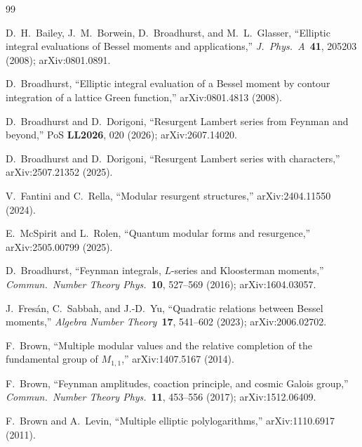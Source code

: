 \documentclass[aps,pra,twocolumn,superscriptaddress,longbibliography]{revtex4-2}
\begin{document}
\begin{thebibliography}{99}

D.~H.~Bailey, J.~M.~Borwein, D.~Broadhurst, and M.~L.~Glasser, ``Elliptic
integral evaluations of Bessel moments and applications,''
\textit{J.\ Phys.\ A}\ \textbf{41}, 205203 (2008); arXiv:0801.0891.

D.~Broadhurst, ``Elliptic integral evaluation of a Bessel moment by contour
integration of a lattice Green function,'' arXiv:0801.4813 (2008).

D.~Broadhurst and D.~Dorigoni, ``Resurgent Lambert series from Feynman and
beyond,'' PoS \textbf{LL2026}, 020 (2026); arXiv:2607.14020.

D.~Broadhurst and D.~Dorigoni, ``Resurgent Lambert series with characters,''
arXiv:2507.21352 (2025).

V.~Fantini and C.~Rella, ``Modular resurgent structures,'' arXiv:2404.11550
(2024).

E.~McSpirit and L.~Rolen, ``Quantum modular forms and resurgence,''
arXiv:2505.00799 (2025).

D.~Broadhurst, ``Feynman integrals, $L$-series and Kloosterman moments,''
\textit{Commun.\ Number Theory Phys.}\ \textbf{10}, 527--569 (2016);
arXiv:1604.03057.

J.~Fres\'an, C.~Sabbah, and J.-D.~Yu, ``Quadratic relations between Bessel
moments,'' \textit{Algebra Number Theory}\ \textbf{17}, 541--602 (2023);
arXiv:2006.02702.

F.~Brown, ``Multiple modular values and the relative completion of the
fundamental group of $M_{1,1}$,'' arXiv:1407.5167 (2014).

F.~Brown, ``Feynman amplitudes, coaction principle, and cosmic Galois group,''
\textit{Commun.\ Number Theory Phys.}\ \textbf{11}, 453--556 (2017);
arXiv:1512.06409.

F.~Brown and A.~Levin, ``Multiple elliptic polylogarithms,'' arXiv:1110.6917
(2011).


\end{thebibliography}
\end{document}
